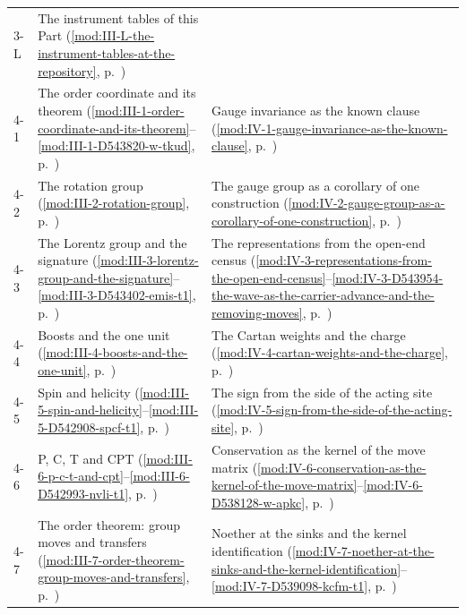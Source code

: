 {\begin{longtable}{p{11mm}p{70mm}p{60mm}}
3-L & The instrument tables of this Part (\ref{mod:III-L-the-instrument-tables-at-the-repository}, p.~\pageref{mod:III-L-the-instrument-tables-at-the-repository}) &  \\
4-1 & The order coordinate and its theorem (\ref{mod:III-1-order-coordinate-and-its-theorem}--\ref{mod:III-1-D543820-w-tkud}, p.~\pageref{mod:III-1-order-coordinate-and-its-theorem}) & Gauge invariance as the known clause (\ref{mod:IV-1-gauge-invariance-as-the-known-clause}, p.~\pageref{mod:IV-1-gauge-invariance-as-the-known-clause}) \\
4-2 & The rotation group (\ref{mod:III-2-rotation-group}, p.~\pageref{mod:III-2-rotation-group}) & The gauge group as a corollary of one construction (\ref{mod:IV-2-gauge-group-as-a-corollary-of-one-construction}, p.~\pageref{mod:IV-2-gauge-group-as-a-corollary-of-one-construction}) \\
4-3 & The Lorentz group and the signature (\ref{mod:III-3-lorentz-group-and-the-signature}--\ref{mod:III-3-D543402-emis-t1}, p.~\pageref{mod:III-3-lorentz-group-and-the-signature}) & The representations from the open-end census (\ref{mod:IV-3-representations-from-the-open-end-census}--\ref{mod:IV-3-D543954-the-wave-as-the-carrier-advance-and-the-removing-moves}, p.~\pageref{mod:IV-3-representations-from-the-open-end-census}) \\
4-4 & Boosts and the one unit (\ref{mod:III-4-boosts-and-the-one-unit}, p.~\pageref{mod:III-4-boosts-and-the-one-unit}) & The Cartan weights and the charge (\ref{mod:IV-4-cartan-weights-and-the-charge}, p.~\pageref{mod:IV-4-cartan-weights-and-the-charge}) \\
4-5 & Spin and helicity (\ref{mod:III-5-spin-and-helicity}--\ref{mod:III-5-D542908-spcf-t1}, p.~\pageref{mod:III-5-spin-and-helicity}) & The sign from the side of the acting site (\ref{mod:IV-5-sign-from-the-side-of-the-acting-site}, p.~\pageref{mod:IV-5-sign-from-the-side-of-the-acting-site}) \\
4-6 & P, C, T and CPT (\ref{mod:III-6-p-c-t-and-cpt}--\ref{mod:III-6-D542993-nvli-t1}, p.~\pageref{mod:III-6-p-c-t-and-cpt}) & Conservation as the kernel of the move matrix (\ref{mod:IV-6-conservation-as-the-kernel-of-the-move-matrix}--\ref{mod:IV-6-D538128-w-apkc}, p.~\pageref{mod:IV-6-conservation-as-the-kernel-of-the-move-matrix}) \\
4-7 & The order theorem: group moves and transfers (\ref{mod:III-7-order-theorem-group-moves-and-transfers}, p.~\pageref{mod:III-7-order-theorem-group-moves-and-transfers}) & Noether at the sinks and the kernel identification (\ref{mod:IV-7-noether-at-the-sinks-and-the-kernel-identification}--\ref{mod:IV-7-D539098-kcfm-t1}, p.~\pageref{mod:IV-7-noether-at-the-sinks-and-the-kernel-identification}) \\

\end{longtable}}
